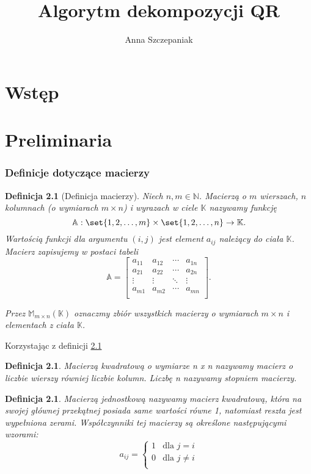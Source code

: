 \documentclass[10pt,a4paper]{report}
\author{Anna Szczepaniak}
\title{Algorytm dekompozycji QR}
\newtheorem{definition}[section]{Definicja}
\begin{document}
\maketitle


\tableofcontents

\chapter{Wstęp}


\chapter{Preliminaria}

\subsection{Definicje dotyczące macierzy} 

\begin{definition}[Definicja macierzy]
Niech $n,m \in \mathbb{N}$. Macierzą o $m$ wierszach, $n$ kolumnach (o wymiarach $m \times n$) i wyrazach w ciele $\mathbb{K}$ nazywamy funkcję 
$$
\mathbb{A}: \set{1,2, \ldots ,m}\times \set{1,2, \ldots ,n} \to \mathbb{K}.
$$
Wartością funkcji dla argumentu $(i,j)$ jest element $a_{ij}$  należący do ciała $\mathbb{K}$. Macierz zapisujemy w postaci tabeli
$$
\mathbb{A} = \left[
        \begin{array}{cccc}
         a_{11} & a_{12} & \cdots & a_{1n} \\
         a_{21} & a_{22} & \cdots & a_{2n} \\
         \vdots & \vdots & \ddots & \vdots \\
         a_{m1} & a_{m2} & \cdots & a_{mn} \\
         \end{array}
      \right].
$$

Przez $\mathbb{M}_{m \times n}(\mathbb{K})$ oznaczmy zbiór wszystkich macierzy o wymiarach $m \times n$ i elementach z ciała $\mathbb{K}$.
\end{definition}

Korzystając z definicji \ref{definicja-macierzy}

\begin{definition} \label{definicja-macierzy}
Macierzą kwadratową o wymiarze n x n nazywamy macierz o liczbie wierszy równiej liczbie kolumn. Liczbę n nazywamy stopniem macierzy.
\end{definition}

\begin{definition}
Macierzą jednostkową nazywamy macierz kwadratową, która na swojej głównej przekątnej posiada same wartości równe 1, natomiast reszta jest wypełniona zerami. Współczynniki tej macierzy są określone następującymi wzorami: 
$$
a_{ij} = \left\{ \begin{array}{ll}
1 & \textrm{dla $j=i$}\\
0 & \textrm{dla $j\ne i$}\\
\end{array} \right.
$$
\end{definition}
\end{document}

